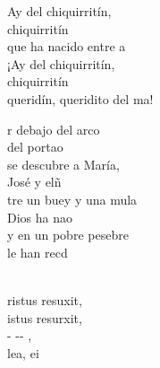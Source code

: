 \documentclass[12pt]{article}
\begin{document}
\begin{multicols*}{2}
\begin{cancion}[Chiquirritín][]%
	\begin{chorus}%
	Ay del chiquirritín,\\
chiquirritín\\
	que ha nacido entre a\\
¡Ay del chiquirritín, \\
chiquirritín\\
	queridín, queridito del ma!\\
	\end{chorus}%
	r debajo del arco \\
	del portao\\
se descubre a María, \\
	José y elñ \\
	tre un buey y una mula\\
	Dios ha nao\\
y en un pobre pesebre \\
	le han recd\\
\end{cancion}%

\begin{cancion}%
	   \\
	ristus resuxit,\\
	istus resurxit,\\
	- -- , \\
	 lea, ei\\
\end{cancion}%


\end{multicols*}
\end{document}
